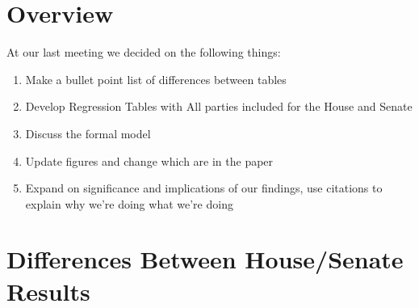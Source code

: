 \documentclass[12pt]{article}
\begin{document}
\section{Overview}

At our last meeting we decided on the following things:

\begin{enumerate}
	\item Make a bullet point list of differences between tables
	
	\item Develop Regression Tables with All parties included for the House and Senate
	
	\item Discuss the formal model
	
	\item Update figures and change which are in the paper
	
	\item Expand on significance and implications of our findings, use citations to explain why we're doing what we're doing
\end{enumerate}

\section{Differences Between House/Senate Results}
\end{document}
